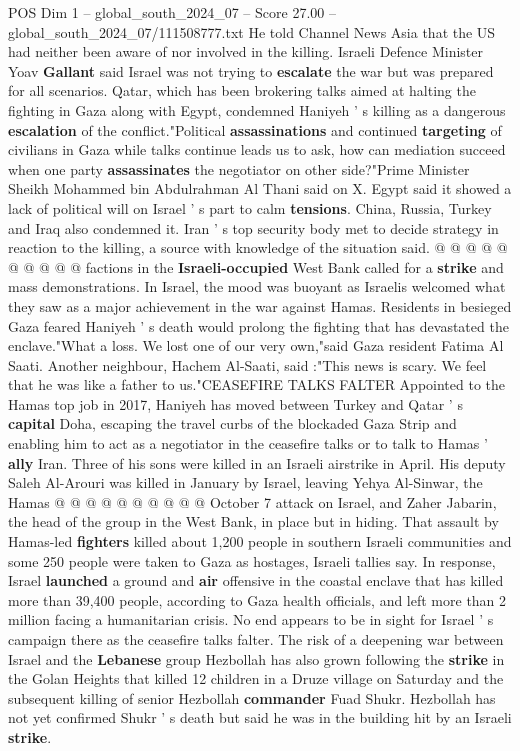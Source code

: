 \begin{textsample}{POS Dim 1 – global\_south\_2024\_07 – Score 27.00 – global\_south\_2024\_07/111508777.txt}
He told Channel News Asia that the US had neither been aware of nor involved in the killing.
Israeli Defence Minister Yoav \textbf{Gallant} said Israel was not trying to \textbf{escalate} the war but was prepared for all scenarios.
Qatar, which has been brokering talks aimed at halting the fighting in Gaza along with Egypt, condemned Haniyeh ' s killing as a dangerous \textbf{escalation} of the conflict."Political \textbf{assassinations} and continued \textbf{targeting} of civilians in Gaza while talks continue leads us to ask, how can mediation succeed when one party \textbf{assassinates} the negotiator on other side?"Prime Minister Sheikh Mohammed bin Abdulrahman Al Thani said on X.
Egypt said it showed a lack of political will on Israel ' s part to calm \textbf{tensions}.
China, Russia, Turkey and Iraq also condemned it.
Iran ' s top security body met to decide strategy in reaction to the killing, a source with knowledge of the situation said. @ @ @ @ @ @ @ @ @ @ factions in the \textbf{Israeli-occupied} West Bank called for a \textbf{strike} and mass demonstrations.
In Israel, the mood was buoyant as Israelis welcomed what they saw as a major achievement in the war against Hamas.
Residents in besieged Gaza feared Haniyeh ' s death would prolong the fighting that has devastated the enclave."What a loss.
We lost one of our very own,"said Gaza resident Fatima Al Saati.
Another neighbour, Hachem Al-Saati, said :"This news is scary.
We feel that he was like a father to us."CEASEFIRE TALKS FALTER Appointed to the Hamas top job in 2017, Haniyeh has moved between Turkey and Qatar ' s \textbf{capital} Doha, escaping the travel curbs of the blockaded Gaza Strip and enabling him to act as a negotiator in the ceasefire talks or to talk to Hamas ' \textbf{ally} Iran.
Three of his sons were killed in an Israeli airstrike in April.
His deputy Saleh Al-Arouri was killed in January by Israel, leaving Yehya Al-Sinwar, the Hamas @ @ @ @ @ @ @ @ @ @ October 7 attack on Israel, and Zaher Jabarin, the head of the group in the West Bank, in place but in hiding.
That assault by Hamas-led \textbf{fighters} killed about 1,200 people in southern Israeli communities and some 250 people were taken to Gaza as hostages, Israeli tallies say.
In response, Israel \textbf{launched} a ground and \textbf{air} offensive in the coastal enclave that has killed more than 39,400 people, according to Gaza health officials, and left more than 2 million facing a humanitarian crisis.
No end appears to be in sight for Israel ' s campaign there as the ceasefire talks falter.
The risk of a deepening war between Israel and the \textbf{Lebanese} group Hezbollah has also grown following the \textbf{strike} in the Golan Heights that killed 12 children in a Druze village on Saturday and the subsequent killing of senior Hezbollah \textbf{commander} Fuad Shukr.
Hezbollah has not yet confirmed Shukr ' s death but said he was in the building hit by an Israeli \textbf{strike}.


\end{textsample}
